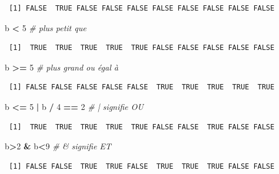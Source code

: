 \documentclass[12pt,]{book}
\newenvironment{Shaded}{\begin{snugshade}}{\end{snugshade}}
\newcommand{\CommentTok}[1]{\textcolor[rgb]{0.56,0.35,0.01}{\textit{#1}}}
\newcommand{\DecValTok}[1]{\textcolor[rgb]{0.00,0.00,0.81}{#1}}
\newcommand{\NormalTok}[1]{#1}
\newcommand{\OperatorTok}[1]{\textcolor[rgb]{0.81,0.36,0.00}{\textbf{#1}}}
\newcommand{\StringTok}[1]{\textcolor[rgb]{0.31,0.60,0.02}{#1}}
\begin{document}
\begin{verbatim}
 [1] FALSE  TRUE FALSE FALSE FALSE FALSE FALSE FALSE FALSE FALSE
\end{verbatim}

\begin{Shaded}
\begin{Highlighting}[]
\NormalTok{b }\OperatorTok{<}\StringTok{ }\DecValTok{5}                      \CommentTok{# plus petit que}
\end{Highlighting}
\end{Shaded}

\begin{verbatim}
 [1]  TRUE  TRUE  TRUE  TRUE  TRUE FALSE FALSE FALSE FALSE FALSE
\end{verbatim}

\begin{Shaded}
\begin{Highlighting}[]
\NormalTok{b }\OperatorTok{>=}\StringTok{ }\DecValTok{5}                     \CommentTok{# plus grand ou égal à}
\end{Highlighting}
\end{Shaded}

\begin{verbatim}
 [1] FALSE FALSE FALSE FALSE FALSE  TRUE  TRUE  TRUE  TRUE  TRUE
\end{verbatim}

\begin{Shaded}
\begin{Highlighting}[]
\NormalTok{b }\OperatorTok{<=}\StringTok{ }\DecValTok{5} \OperatorTok{|}\StringTok{ }\NormalTok{b }\OperatorTok{/}\StringTok{ }\DecValTok{4} \OperatorTok{==}\StringTok{ }\DecValTok{2}        \CommentTok{# | signifie OU}
\end{Highlighting}
\end{Shaded}

\begin{verbatim}
 [1]  TRUE  TRUE  TRUE  TRUE  TRUE FALSE FALSE  TRUE FALSE FALSE
\end{verbatim}

\begin{Shaded}
\begin{Highlighting}[]
\NormalTok{b}\OperatorTok{>}\DecValTok{2} \OperatorTok{&}\StringTok{ }\NormalTok{b}\OperatorTok{<}\DecValTok{9}                  \CommentTok{# & signifie ET}
\end{Highlighting}
\end{Shaded}

\begin{verbatim}
 [1] FALSE FALSE  TRUE  TRUE FALSE  TRUE  TRUE  TRUE FALSE FALSE
\end{verbatim}
\end{document}

